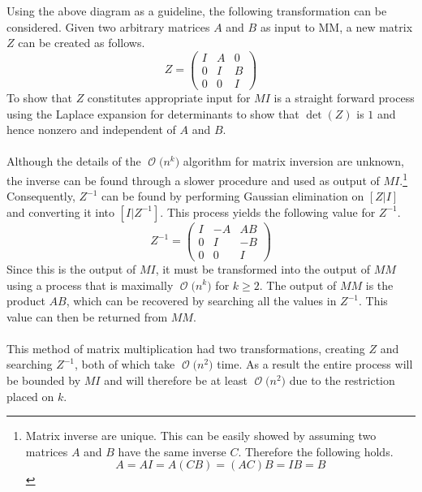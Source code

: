 \documentclass[12pt]{article}
\newcommand{\BigO}[1]{\ensuremath{\operatorname{\mathcal{O}}\bigl(#1\bigr)}}
\begin{document}
Using the above diagram as a guideline, the following transformation
can be considered.  Given two arbitrary matrices $A$ and $B$ as input
to MM, a new matrix $Z$ can be created as follows.
\[
Z =
    \begin{pmatrix}
    I & A & 0 \\
    0 & I & B \\
    0 & 0 & I 
    \end{pmatrix}
\]
To show that $Z$ constitutes appropriate input for $MI$ is a straight
forward process using the Laplace expansion for determinants to show
that $\det(Z)$ is $1$ and hence nonzero and independent of $A$ and $B$.\\\\
Although the details of the \BigO{n^k} algorithm for matrix inversion
are unknown, the inverse can be found through a slower procedure and 
used as output of $MI$.\footnote{Matrix inverse are unique.  This can
be easily showed by assuming two matrices $A$ and $B$ have the same inverse
$C$.  Therefore the following holds.
\[
A = AI = A(CB) = (AC)B = IB = B
\]
}
Consequently, $Z^{-1}$ can be found by performing Gaussian elimination
on $[Z|I]$ and converting it into $[I|Z^{-1}]$.  This process yields the
following value for $Z^{-1}$.
\[
Z^{-1} =
    \begin{pmatrix}
    I & -A & AB \\
    0 & I & -B \\
    0 & 0 & I 
    \end{pmatrix}
\]
Since this is the output of $MI$, it must be transformed into the output
of $MM$ using a process that is maximally \BigO{n^k} for $k\geq2$.  The
output of $MM$ is the product $AB$, which can be recovered by searching 
all the values in $Z^{-1}$.  This value can then be returned from $MM$.\\\\
This method of matrix multiplication had two transformations, creating
$Z$ and searching $Z^{-1}$, both of which take \BigO{n^2} time.  As a result
the entire process will be bounded by $MI$ and will therefore be at least
\BigO{n^2} due to the restriction placed on $k$.
\end{document}
